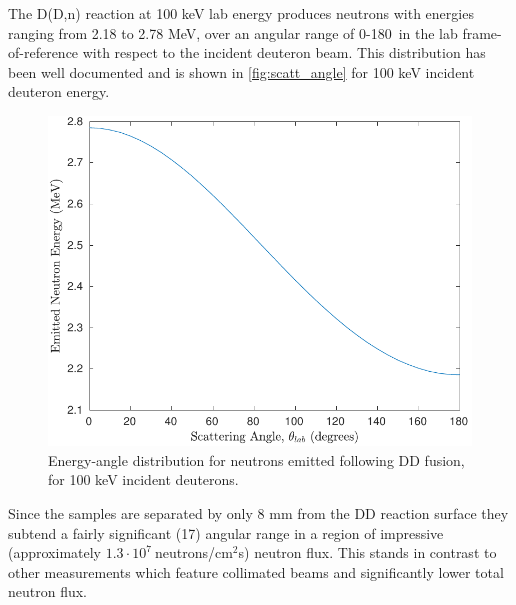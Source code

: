 \documentclass[5p]{elsarticle}
\newcommand{\sci}[2]{ #1 \cdot 10^{#2}\ }
\newcommand{\comment}[1]{\todo[color=blue!20!white,inline]{ASV: #1}}
\newcommand{\mytilde}{\raisebox{0.5ex}{\texttildelow}}
\begin{document}
The D(D,n) reaction at 100 keV lab energy produces neutrons with energies ranging from 
2.18 to 2.78 MeV, over an angular range of 0-180\degree\ in the lab frame-of-reference with respect to the incident deuteron beam.
This distribution has been well documented \cite{Liskien_Paulsen_1973} and is shown in \autoref{fig:scatt_angle} for 100 keV incident deuteron energy.






\begin{figure}
 \centering
 \includegraphics[scale=0.6]{./figures/scatt_angle.pdf}
 \caption{Energy-angle distribution for neutrons emitted following DD fusion, for 100 keV incident deuterons.}
 \label{fig:scatt_angle}
\end{figure}

Since the samples are separated by only  8 mm from the DD reaction surface they  subtend a fairly significant  (\mytilde 17\degree)
angular range in a region of impressive  (approximately $\sci{1.3}{7}$neutrons/cm$^2$s) neutron flux.
This stands in contrast to other measurements which feature collimated beams and significantly lower total neutron flux.
 
\end{document}
